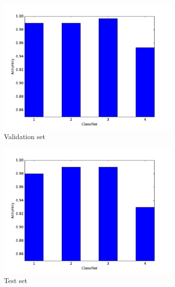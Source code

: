 \documentclass[10pt,psamsfonts]{amsart}
\theoremstyle{definition}
\theoremstyle{remark}
\numberwithin{equation}{section}
\begin{document}
\begin{figure}
	\centering
	\begin{subfigure}[b]{0.23\textwidth}
		\includegraphics[width=\textwidth]{hw2_4-2_valid.pdf}
		\caption{Validation set}
	\end{subfigure}
	\begin{subfigure}[b]{0.23\textwidth}
		\includegraphics[width=\textwidth]{hw2_4-2_test.pdf}
		\caption{Test set}
	\end{subfigure}
	\begin{subfigure}[b]{0.23\textwidth}

\end{subfigure}
\end{figure}
\end{document}

